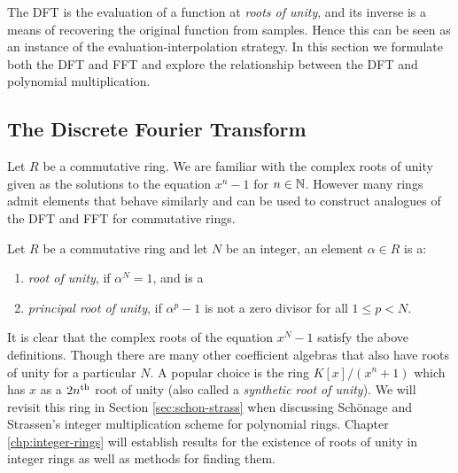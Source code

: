 The DFT is the evaluation of a function at \textit{roots of unity}, and its inverse is a means of recovering the original function from samples. Hence this can be seen as an instance of the evaluation-interpolation strategy. 
In this section we formulate both the DFT and FFT and explore the relationship between the DFT and polynomial multiplication.

\subsection{The Discrete Fourier Transform}

Let $R$ be a commutative ring. We are familiar with the complex roots of unity given as the solutions to the equation $x^n - 1$ for $n \in {\mathbb N}$. However many rings admit elements that behave similarly and can be used to construct analogues of the DFT and FFT for commutative rings.

\begin{definition}
  Let $R$ be a commutative ring and let $N$ be an integer, an element $\alpha \in R$ is a: 
  \begin{enumerate}
      \item \textit{root of unity}, if $\alpha^N = 1$, and is a
      \item \textit{principal root of unity}, if $\alpha^p - 1$ is not a zero divisor for all $1 \leq p < N$.
  \end{enumerate}
\end{definition}

It is clear that the complex roots of the equation $x^N - 1$ satisfy the above definitions. Though there are many other coefficient algebras that also have roots of unity for a particular $N$. A popular choice is the ring $K[x]/(x^n + 1)$ which has $x$ as a $2n^{\textrm{th}}$ root of unity (also called a \textit{synthetic root of unity}). We will revisit this ring in Section \ref{sec:schon-strass} when discussing Sch\"{o}nage and Strassen's integer multiplication scheme for polynomial rings. Chapter \ref{chp:integer-rings} will establish results for the existence of roots of unity in integer rings as well as methods for finding them. 


